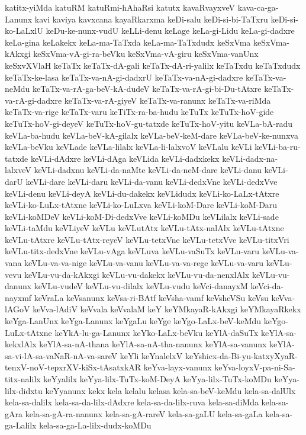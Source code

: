 {katitx-yiMda
katuRM
katuRmi-hAhaRsi
katutx
kavaRvayxveV
kava-ca-ga-Lanunx
kavi
kaviya
kavxcana
kayaRkarxma
keDi-salu
keDi-si-bi-TaTxru
keDi-si-ko-LaLxlU
keDu-ke-nunx-vudU
keLLi-denu
keLage
keLa-gi-Lidu
keLa-gi-dadxre
keLa-gina
keLakekx
keLa-ma-TaTxda
keLa-ma-TaTxdudx
keSxVma
keSxVma-kAkxgi
keSxVma-vA-gi-ra-beVku
keSxVma-vA-giru
keSxVma-vanUnx
keSxvXVlaH
keTaTx
keTaTx-dA-gali
keTaTx-dA-ri-yalilx
keTaTxdu
keTaTxdudx
keTaTx-ke-lasa
keTaTx-va-nA-gi-dadxrU
keTaTx-va-nA-gi-dadxre
keTaTx-va-neMdu
keTaTx-va-rA-ga-beV-kA-dudeV
keTaTx-va-rA-gi-bi-Du-tAtxre
keTaTx-va-rA-gi-dadxre
keTaTx-va-rA-giyeV
keTaTx-va-ranunx
keTaTx-va-riMda
keTaTx-va-rige
keTaTx-varu
keTiTx-ra-ba-hudu
keTuTx
keTuTx-hoV-gide
keTuTx-hoV-gi-deyeV
keTuTx-hoV-gu-tatxde
keTuTx-hoV-yitu
keVLa-bA-radu
keVLa-ba-hudu
keVLa-beV-kA-gilalx
keVLa-beV-keM-dare
keVLa-beV-ke-nunxva
keVLa-beVku
keVLade
keVLa-lilalx
keVLa-li-lalxvoV
keVLalu
keVLi
keVLi-ba-ru-tatxde
keVLi-dAdxre
keVLi-dAga
keVLida
keVLi-dadxkekx
keVLi-dadx-na-lalxveV
keVLi-dadxnu
keVLi-da-naMte
keVLi-da-neM-dare
keVLi-danu
keVLi-darU
keVLi-dare
keVLi-daru
keVLi-da-vanu
keVLi-dedxVne
keVLi-dedxVve
keVLi-denu
keVLi-deyA
keVLi-du-dakekx
keVLidudx
keVLi-ko-LaLx-tAtxre
keVLi-ko-LuLx-tAtxne
keVLi-ko-LuLxva
keVLi-koM-Dare
keVLi-koM-Daru
keVLi-koMDeV
keVLi-koM-Di-dedxVve
keVLi-koMDu
keVLilalx
keVLi-sade
keVLi-taMdu
keVLiyeV
keVLu
keVLutAtx
keVLu-tAtx-nalAlx
keVLu-tAtxne
keVLu-tAtxre
keVLu-tAtx-reyeV
keVLu-tetxVne
keVLu-tetxVve
keVLu-titxVri
keVLu-titx-dedxVne
keVLu-vAga
keVLuva
keVLu-vaSuTx
keVLu-varu
keVLu-va-vana
keVLu-va-va-nige
keVLu-va-vanu
keVLu-va-va-rege
keVLu-va-varu
keVLu-vevu
keVLu-vu-da-kAkxgi
keVLu-vu-dakekx
keVLu-vu-da-nenxlAlx
keVLu-vu-danunx
keVLu-vudeV
keVLu-vu-dilalx
keVLu-vudu
keVci-danayxM
keVci-da-nayxmf
keVraLa
keVsanunx
keVsa-ri-BAtf
keVsha-vamf
keVsheVSu
keVsu
keVva-lAGoV
keVva-lAdiV
keVvala
keVvalaM
keY
keYMkayaR-kAkxgi
keYMkayaRkekx
keYga-LanUnx
keYga-Lanunx
keYgaLu
keYge
keYgo-LaLx-beV-keMdu
keYgo-LuLx-tAtxne
keYkA-lu-ga-Lanunx
keYko-LaLx-beVku
keYlA-daSuTx
keYlA-sa-kekxlAlx
keYlA-sa-nA-thana
keYlA-sa-nA-tha-nanunx
keYlA-sa-vanunx
keYlA-sa-vi-lA-sa-vaNaR-nA-va-sareV
keYli
keYnalelxV
keYshicx-da-Bi-yu-katxyXyaR-tenxV-noV-tepxrXV-kiSx-tAsatxkAR
keYva-layx-vanunx
keYva-loyxV-pa-ni-Sa-titx-nalilx
keYyalilx
keYya-lilx-TuTx-koM-DeyA
keYya-lilx-TuTx-koMDu
keYya-lilx-didxtu
keYyanunx
kekx
kela
kelalu
kelasa
kela-sa-beV-keMdu
kela-sa-dalUlx
kela-sa-dalilx
kela-sa-da-lilx-dAdxre
kela-sa-da-lilx-ruva
kela-sa-diMda
kela-sa-gAra
kela-sa-gA-ra-nanunx
kela-sa-gA-rareV
kela-sa-gaLU
kela-sa-gaLa
kela-sa-ga-Lalilx
kela-sa-ga-La-lilx-dudx-koMDu
}
